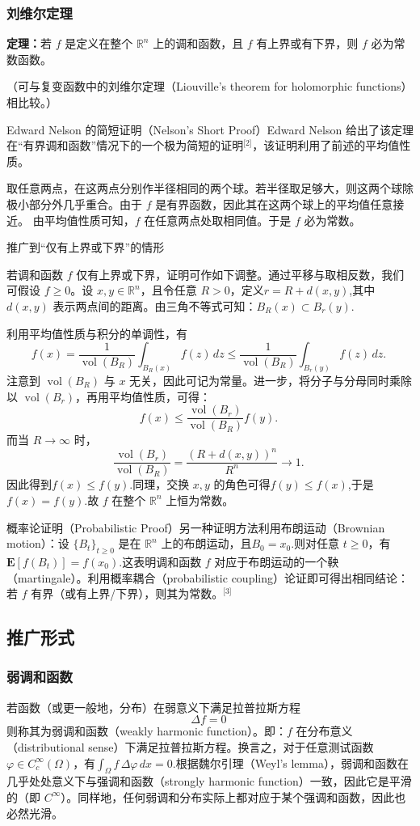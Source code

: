 \subsubsection{刘维尔定理}
\textbf{定理：}若 \( f \) 是定义在整个 \(\mathbb{R}^n\) 上的调和函数，且 \( f \) 有上界或有下界，则 \( f \) 必为常数函数。

（可与复变函数中的刘维尔定理（Liouville's theorem for holomorphic functions）相比较。）

Edward Nelson 的简短证明（Nelson’s Short Proof）Edward Nelson 给出了该定理在“有界调和函数”情况下的一个极为简短的证明\(^\text{[2]}\)，该证明利用了前述的平均值性质。

取任意两点，在这两点分别作半径相同的两个球。若半径取足够大，则这两个球除极小部分外几乎重合。由于 \( f \) 是有界函数，因此其在这两个球上的平均值任意接近。  由平均值性质可知，\( f \) 在任意两点处取相同值。于是 \( f \) 必为常数。

推广到“仅有上界或下界”的情形

若调和函数 \( f \) 仅有上界或下界，证明可作如下调整。通过平移与取相反数，我们可假设 \( f \ge 0 \)。设 \(x, y \in \mathbb{R}^n\)，且令任意 \(R > 0\)，定义\(r = R + d(x, y)\),其中 \(d(x,y)\) 表示两点间的距离。由三角不等式可知：\(B_R(x) \subset B_r(y)\).

利用平均值性质与积分的单调性，有
\[
f(x)
=
\frac{1}{\operatorname{vol}(B_R)}
\int_{B_R(x)} f(z)\,dz
\le
\frac{1}{\operatorname{vol}(B_R)}
\int_{B_r(y)} f(z)\,dz.~
\]
注意到 \(\operatorname{vol}(B_R)\) 与 \(x\) 无关，因此可记为常量。进一步，将分子与分母同时乘除以 \(\operatorname{vol}(B_r)\)，再用平均值性质，可得：
\[
f(x)
\le
\frac{\operatorname{vol}(B_r)}{\operatorname{vol}(B_R)} f(y).~
\]
而当 \(R \to \infty\) 时，
\[
\frac{\operatorname{vol}(B_r)}{\operatorname{vol}(B_R)}
=
\frac{(R + d(x,y))^n}{R^n}
\to 1.~
\]
因此得到\(f(x) \le f(y)\).同理，交换 \(x, y\) 的角色可得\(f(y) \le f(x)\),于是\(f(x) = f(y)\).故 \( f \) 在整个 \(\mathbb{R}^n\) 上恒为常数。

概率论证明（Probabilistic Proof）另一种证明方法利用布朗运动（Brownian motion）：设 \(\{B_t\}_{t \ge 0}\) 是在 \(\mathbb{R}^n\) 上的布朗运动，且\(B_0 = x_0\).则对任意 \(t \ge 0\)，有\(\mathbf{E}[f(B_t)] = f(x_0)\).这表明调和函数 \(f\) 对应于布朗运动的一个鞅（martingale）。利用概率耦合（probabilistic coupling）论证即可得出相同结论：若 \(f\) 有界（或有上界/下界），则其为常数。\(^\text{[3]}\)
\subsection{推广形式}
\subsubsection{弱调和函数}
若函数（或更一般地，分布）在弱意义下满足拉普拉斯方程
\[
\Delta f = 0~
\]
则称其为弱调和函数（weakly harmonic function）。即：\(f\) 在分布意义（distributional sense）下满足拉普拉斯方程。换言之，对于任意测试函数 \(\varphi \in C_c^\infty(\Omega)\)，有\(\int_{\Omega} f \, \Delta \varphi \, dx = 0.\)根据魏尔引理（Weyl’s lemma），弱调和函数在几乎处处意义下与强调和函数（strongly harmonic function）一致，因此它是平滑的（即 \(C^\infty\)）。同样地，任何弱调和分布实际上都对应于某个强调和函数，因此也必然光滑。


